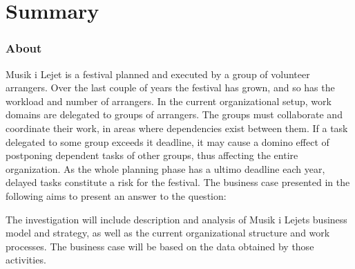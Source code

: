 \part{Summary}

\section{About}
Musik i Lejet is a festival planned and executed by a group of volunteer arrangers. Over the last couple of years the festival has grown, and so has the workload and number of arrangers. In the current organizational setup, work domains are delegated to groups of arrangers. The groups must collaborate and coordinate their work, in areas where dependencies exist between them. If a task delegated to some group exceeds it deadline, it may cause a domino effect of postponing dependent tasks of other groups, thus affecting the entire organization. As the whole planning phase has a ultimo deadline each year, delayed tasks constitute a risk for the festival. The business case presented in the following aims to present an answer to the question:
\vspace{1pt}
\begin{center}
\end{center}
\vspace{1pt}
\noindent
The investigation will include description and analysis of Musik i Lejets business model and strategy, as well as the current organizational structure and work processes. The business case will be based on the data obtained by those activities.

